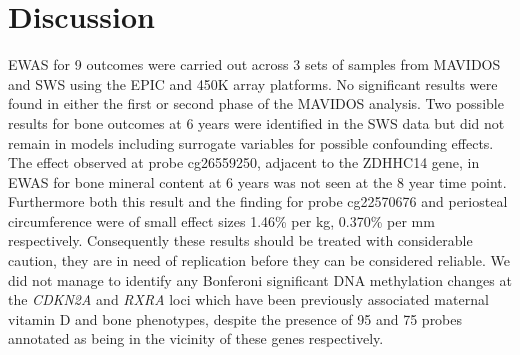 \documentclass[
]{book}
\begin{document}
\hypertarget{discussion}{%
\section{Discussion}\label{discussion}}

EWAS for 9 outcomes were carried out across 3 sets of samples from MAVIDOS and SWS using the EPIC and 450K array platforms.
No significant results were found in either the first or second phase of the MAVIDOS analysis.
Two possible results for bone outcomes at 6 years were identified in the SWS data but did not remain in models including surrogate variables for possible confounding effects.
The effect observed at probe cg26559250, adjacent to the ZDHHC14 gene, in EWAS for bone mineral content at 6 years was not seen at the 8 year time point.
Furthermore both this result and the finding for probe cg22570676 and periosteal circumference were of small effect sizes 1.46\% per kg, 0.370\% per mm respectively.
Consequently these results should be treated with considerable caution, they are in need of replication before they can be considered reliable.
We did not manage to identify any Bonferoni significant DNA methylation changes at the \emph{CDKN2A} and \emph{RXRA} loci which have been previously associated maternal vitamin D and bone phenotypes, despite the presence of 95 and 75 probes annotated as being in the vicinity of these genes respectively.
\end{document}
